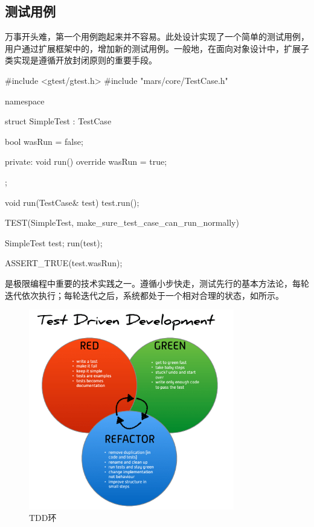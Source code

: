 \begin{content}

\subsection{测试用例}

万事开头难，第一个用例跑起来并不容易。此处设计实现了一个简单的测试用例，用户通过扩展框架中的，增加新的测试用例。一般地，在面向对象设计中，扩展子类实现是遵循开放封闭原则的重要手段。

\begin{leftbar}
 \begin{c++}[caption={\ttfamily{test/mars/core/TestCaseSpec.cc}}]
#include <gtest/gtest.h>
#include "mars/core/TestCase.h"

namespace {
  struct SimpleTest : TestCase {
    bool wasRun = false;

  private:
    void run() override {
      wasRun = true;
    }
  };

  void run(TestCase& test) {
    test.run();
  }
}

TEST(SimpleTest, make_sure_test_case_can_run_normally) {
  SimpleTest test;
  run(test);

  ASSERT_TRUE(test.wasRun);
}
 \end{c++}
\end{leftbar}

\begin{story}
  \begin{center}
  \end{center}

\begin{content}

是极限编程中重要的技术实践之一。遵循小步快走，测试先行的基本方法论，每轮迭代依次执行；每轮迭代之后，系统都处于一个相对合理的状态，如所示。

\begin{figure}[H]
\centering
\includegraphics[width=0.8\textwidth]{figures/xunit/tdd_cycle.png}
\caption{TDD环}
 \label{fig:tdd-cycle}
\end{figure}


\end{content}
\end{story}
\end{content}
